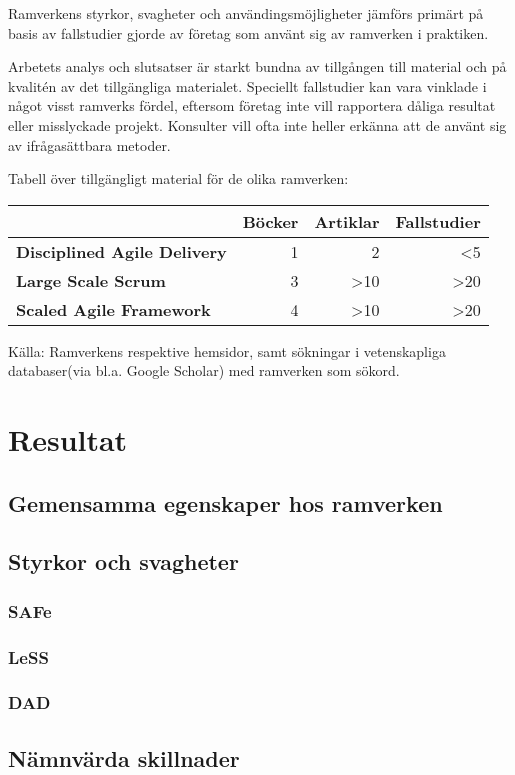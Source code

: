 	Ramverkens styrkor, svagheter och användingsmöjligheter jämförs primärt på basis av fallstudier gjorde av företag som använt sig av ramverken i praktiken.
	
	
	
	Arbetets analys och slutsatser är starkt bundna av tillgången till material och på kvalitén av det tillgängliga materialet. Speciellt fallstudier kan vara vinklade i något visst ramverks fördel, eftersom företag inte vill rapportera dåliga resultat eller misslyckade projekt. Konsulter vill ofta inte heller erkänna att de använt sig av ifrågasättbara metoder.
	
	
	Tabell över tillgängligt material för de olika ramverken:

	\begin{center}
	\begin{tabular}{ >{\bfseries}l | r | r | r }
		 	 						& Böcker & Artiklar & Fallstudier 	\\ \hline
		Disciplined Agile Delivery 	& 1 	& 2			& <5 			\\ \hline
		Large Scale Scrum 			& 3 	& >10		& >20 			\\ \hline
		Scaled Agile Framework 		& 4 	& >10		& >20 			\\ 
	\end{tabular}
	\end{center}
	
	Källa: Ramverkens respektive hemsidor\cite{dad_web, less_web, safe_web}, samt sökningar i vetenskapliga databaser(via bl.a. Google Scholar) med ramverken som sökord.
	
	
	
\newpage
\section{Resultat}
	
	
	
	
	\subsection{Gemensamma egenskaper hos ramverken}
	
	
	
	\subsection{Styrkor och svagheter}
	
	\subsubsection{SAFe}
	
	
	
	\subsubsection{LeSS}
	
	\subsubsection{DAD}
	
	\subsection{Nämnvärda skillnader}
